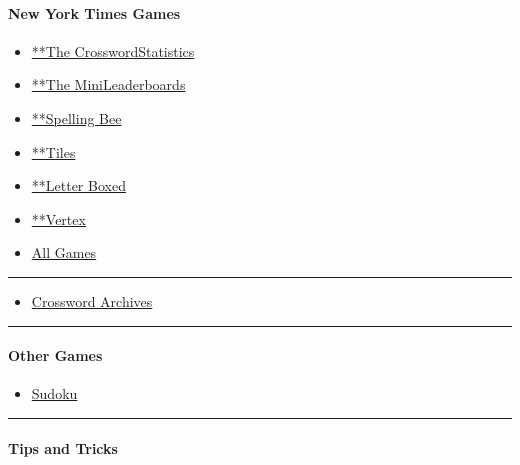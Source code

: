 \hypertarget{new-york-times-games}{%
\paragraph{New York Times Games}\label{new-york-times-games}}

\begin{itemize}
\tightlist
\item
  \href{/crosswords/game/daily}{**The
  Crossword}\href{/puzzles/stats}{Statistics}
\item
  \href{/crosswords/game/mini}{**The
  Mini}\href{/puzzles/leaderboards}{Leaderboards}
\item
  \href{/puzzles/spelling-bee}{**Spelling Bee}
\item
  \href{/puzzles/tiles}{**Tiles}
\item
  \href{/puzzles/letter-boxed}{**Letter Boxed}
\item
  \href{/puzzles/vertex}{**Vertex}
\item
  \href{/crosswords}{All Games}
\end{itemize}

\begin{center}\rule{0.5\linewidth}{\linethickness}\end{center}

\begin{itemize}
\tightlist
\item
  \href{/crosswords/archive}{Crossword Archives}
\end{itemize}

\begin{center}\rule{0.5\linewidth}{\linethickness}\end{center}

\hypertarget{other-games}{%
\paragraph{Other Games}\label{other-games}}

\begin{itemize}
\tightlist
\item
  \href{/puzzles/sudoku}{Sudoku}
\end{itemize}

\begin{center}\rule{0.5\linewidth}{\linethickness}\end{center}

\hypertarget{tips-and-tricks}{%
\paragraph{Tips and Tricks}\label{tips-and-tricks}}

